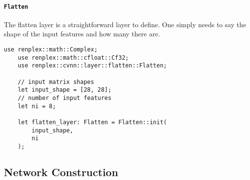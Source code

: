 \paragraph{\texttt{Flatten}}

The flatten layer is a straightforward layer to define. One simply needs to say the shape of the input features and how many there are.

\begin{lstlisting}[caption=Initialization of a flatten layer.]
	use renplex::math::Complex;
	use renplex::math::cfloat::Cf32;
	use renplex::cvnn::layer::flatten::Flatten;
	
	// input matrix shapes
	let input_shape = [28, 28];
	// number of input features
	let ni = 8;
	
	let flatten_layer: Flatten = Flatten::init(
		input_shape, 
		ni
	);

\end{lstlisting}

\subsection{Network Construction}

